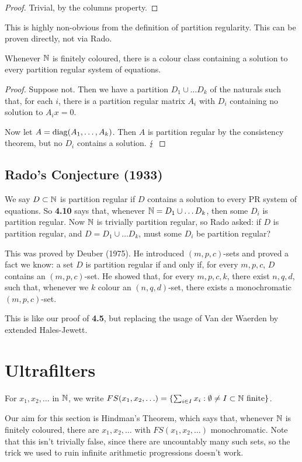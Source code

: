\documentclass[10pt,a4paper]{article}
\begin{document}
\begin{proof}
  Trivial, by the columns property.
\end{proof}
This is highly non-obvious from the definition of partition regularity. This can be proven directly, not via Rado.
\begin{theorem}
  Whenever $\mathbb{N}$ is finitely coloured, there is a colour class containing a solution to every partition regular system of equations.
\end{theorem}
\begin{proof}
  Suppose not. Then we have a partition $D_1 \cup \ldots D_k$ of the naturals such that, for each $i$, there is a partition regular matrix $A_i$ with $D_i$ containing no solution to $A_i x = 0$.

  Now let $A = \operatorname{diag}(A_1, \ldots, A_k)$. Then $A$ is partition regular by the consistency theorem, but no $D_i$ contains a solution. $\lightning$
\end{proof}
\subsection{Rado's Conjecture (1933)}
We say $D \subset \mathbb{N}$ is partition regular if $D$ contains a solution to every PR system of equations. So \textbf{4.10} says that, whenever $\mathbb{N} = D_1 \cup \ldots D_k$, then some $D_i$ is partition regular.  Now $\mathbb{N}$ is trivially partition regular, so Rado asked: if $D$ is partition regular, and $D = D_1 \cup \ldots D_k$, must some $D_i$ be partition regular?

This was proved by Deuber (1975). He introduced $(m,p,c)$-sets and proved a fact we know: a set $D$ is partition regular if and only if, for every $m,p,c$, $D$ contains an $(m,p,c)$-set. He showed that, for every $m,p,c,k$, there exist $n,q,d$, such that, whenever we $k$ colour an $(n,q,d)$-set, there exists a monochromatic $(m,p,c)$-set.

This is like our proof of \textbf{4.5}, but replacing the usage of Van der Waerden by extended Hales-Jewett.

\section{Ultrafilters}
For $x_1, x_2, \ldots$ in $\mathbb{N}$, we write $FS(x_1, x_2, \ldots) = \{\sum_{i \in I} x_i : \emptyset \neq I \subset \mathbb{N} \text{ finite}\}$.

Our aim for this section is Hindman's Theorem, which says that, whenever $\mathbb{N}$ is finitely coloured, there are $x_1, x_2, \ldots$ with $FS(x_1, x_2, \ldots)$ monochromatic. Note that this isn't trivially false, since there are uncountably many such sets, so the trick we used to ruin infinite arithmetic progressions doesn't work.
\end{document}

